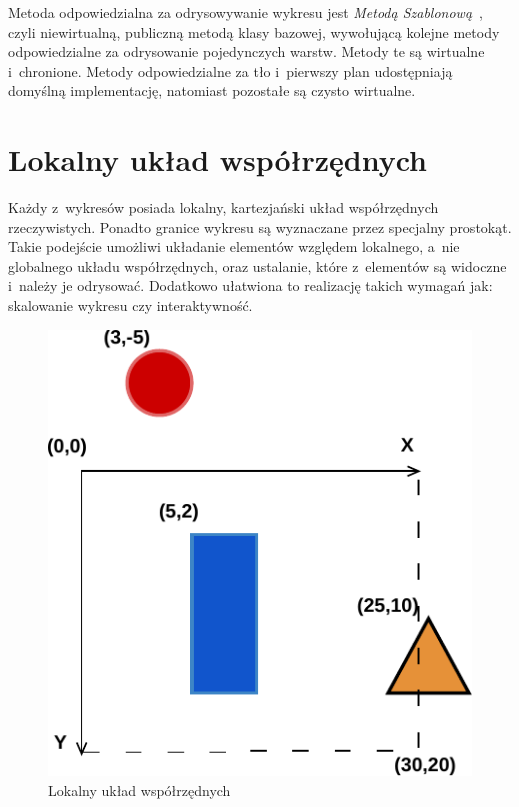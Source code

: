 Metoda odpowiedzialna za odrysowywanie wykresu jest \textit{Metodą Szablonową}~\cite{Patterns}, czyli niewirtualną, publiczną metodą klasy bazowej, wywołującą kolejne metody odpowiedzialne za odrysowanie pojedynczych warstw. Metody te są wirtualne i~chronione.
Metody odpowiedzialne za tło i~pierwszy plan udostępniają domyślną implementację, natomiast pozostałe są czysto wirtualne.

\section{Lokalny układ współrzędnych}
Każdy z~wykresów posiada lokalny, kartezjański układ współrzędnych rzeczywistych. Ponadto granice wykresu są wyznaczane przez specjalny prostokąt. Takie podejście umożliwi układanie elementów względem lokalnego, a~nie globalnego układu współrzędnych, oraz ustalanie, które z~elementów są widoczne i~należy je odrysować. Dodatkowo ułatwiona to realizację takich wymagań jak: skalowanie wykresu czy interaktywność. 

\begin{figure}[H]
\centering
\includegraphics{img/uklad_wspolrzednych.pdf}
\caption{Lokalny układ współrzędnych}\label{rys:uklad:wspolrzednych}
\end{figure}

